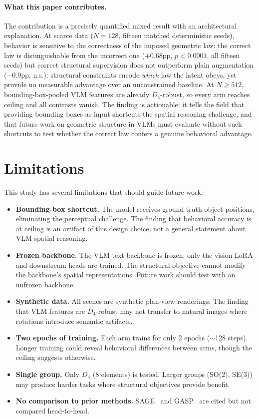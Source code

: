 \documentclass[10pt,twocolumn,letterpaper]{article}
\begin{document}
\paragraph{What this paper contributes.}
The contribution is a precisely quantified mixed result with an
architectural explanation. At scarce data ($N{=}128$, fifteen matched
deterministic seeds), behavior is sensitive to the correctness of the
imposed geometric law: the correct law is distinguishable from the
incorrect one ($+0.68$pp, $p<0.0001$, all fifteen seeds) but correct
structural supervision does not outperform plain augmentation
($-0.9$pp, n.s.): structural constraints encode \emph{which} law the
latent obeys, yet provide no measurable advantage over an
unconstrained baseline. At $N \geq 512$,
bounding-box-pooled VLM features are already $D_4$-robust, so every
arm reaches ceiling and all contrasts vanish. The finding is
actionable: it tells the field that providing bounding boxes as input
shortcuts the spatial reasoning challenge, and that future work on
geometric structure in VLMs must evaluate without such shortcuts to
test whether the correct law confers a genuine behavioral advantage.

\section{Limitations}

This study has several limitations that should guide future work:

\begin{itemize}[leftmargin=*]
\item \textbf{Bounding-box shortcut.} The model receives ground-truth
object positions, eliminating the perceptual challenge. The finding
that behavioral accuracy is at ceiling is an artifact of this design
choice, not a general statement about VLM spatial reasoning.
\item \textbf{Frozen backbone.} The VLM text backbone is frozen; only
the vision LoRA and downstream heads are trained. The structural
objective cannot modify the backbone's spatial representations.
Future work should test with an unfrozen backbone.
\item \textbf{Synthetic data.} All scenes are synthetic plan-view
renderings. The finding that VLM features are $D_4$-robust may not
transfer to natural images where rotations introduce semantic
artifacts.
\item \textbf{Two epochs of training.} Each arm trains for only 2
epochs ($\sim$128 steps). Longer training could reveal behavioral
differences between arms, though the ceiling suggests otherwise.
\item \textbf{Single group.} Only $D_4$ (8 elements) is tested. Larger
groups (SO(2), SE(3)) may produce harder tasks where structural
objectives provide benefit.
\item \textbf{No comparison to prior methods.} SAGE~\cite{sage2026}
and GASP~\cite{yeh2026gasp} are cited but not compared head-to-head.
\end{itemize}
\end{document}
